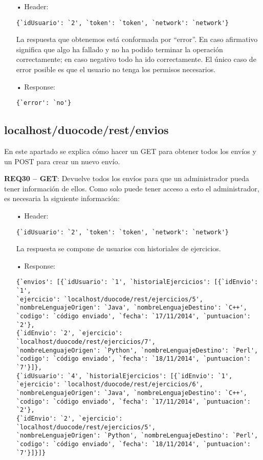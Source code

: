 \begin{itemize}
\item[•]
Header: 
{\codesize
\begin{verbatim}
{`idUsuario': `2', `token': `token', `network': `network'}
\end{verbatim}
}

La respuesta que obtenemos está conformada por ``error''. En caso afirmativo significa que algo ha fallado y no ha podido terminar la operación correctamente; en caso negativo todo ha ido correctamente. El único caso de error posible es que el usuario no tenga los permisos necesarios.

\item[•]
Response: 
{\codesize
\begin{verbatim}
{`error': `no'}
\end{verbatim}
}
\end{itemize}

\subsection{localhost/duocode/rest/envios}
En este apartado se explica cómo hacer un GET para obtener todos los envíos y un POST para crear un nuevo envío.
\vspace{1em}

\textbf{REQ30 – GET}: Devuelve todos los envíos para que un administrador pueda tener información de ellos. Como solo puede tener acceso a esto el administrador, es necesaria la siguiente información:

\begin{itemize}
\item[•]
Header: 
{\codesize
\begin{verbatim}
{`idUsuario': `2', `token': `token', `network': `network'}
\end{verbatim}
}

La respuesta se compone de usuarios con historiales de ejercicios.

\item[•]
Response: 
{\codesize
\begin{verbatim}
{`envios': [{`idUsuario': `1', `historialEjercicios': [{`idEnvio': `1', 
`ejercicio': `localhost/duocode/rest/ejercicios/5', 
`nombreLenguajeOrigen': `Java', `nombreLenguajeDestino': `C++', 
`codigo': `código enviado', `fecha': `17/11/2014', `puntuacion': `2'}, 
{`idEnvio': `2', `ejercicio': `localhost/duocode/rest/ejercicios/7', 
`nombreLenguajeOrigen': `Python', `nombreLenguajeDestino': `Perl', 
`codigo': `código enviado', `fecha': `18/11/2014', `puntuacion': `7'}]}, 
{`idUsuario': `4', `historialEjercicios': [{`idEnvio': `1', 
`ejercicio': `localhost/duocode/rest/ejercicios/6', 
`nombreLenguajeOrigen': `Java', `nombreLenguajeDestino': `C++', 
`codigo': `código enviado', `fecha': `17/11/2014', `puntuacion': `2'}, 
{`idEnvio': `2', `ejercicio': `localhost/duocode/rest/ejercicios/5', 
`nombreLenguajeOrigen': `Python', `nombreLenguajeDestino': `Perl', 
`codigo': `código enviado', `fecha': `18/11/2014', `puntuacion': `7'}]}]}
\end{verbatim}
}
\end{itemize}

